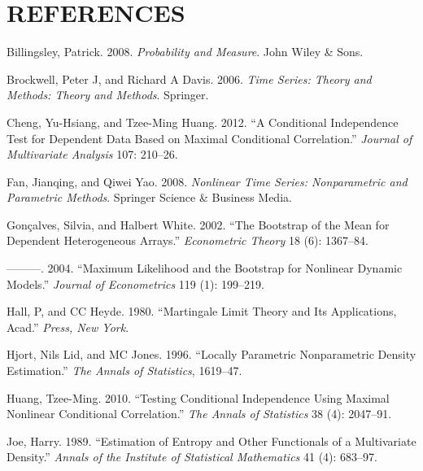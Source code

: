 \documentclass[
  12pt,
  letterpaper]{article}
\numberwithin{equation}{section}
\newlength{\cslhangindent}
\newenvironment{cslreferences}%
  {\setlength{\parindent}{0pt}%
  \everypar{\setlength{\hangindent}{\cslhangindent}}\ignorespaces}%
  {\par}
\begin{document}
\newpage

\hypertarget{references}{%
\section*{REFERENCES}\label{references}}

\hypertarget{refs}{}
\begin{cslreferences}
\leavevmode\hypertarget{ref-bill:2008}{}%
Billingsley, Patrick. 2008. \emph{Probability and Measure}. John Wiley \& Sons.

\leavevmode\hypertarget{ref-brockwell1991time}{}%
Brockwell, Peter J, and Richard A Davis. 2006. \emph{Time Series: Theory and Methods: Theory and Methods}. Springer.

\leavevmode\hypertarget{ref-cheng2012conditional}{}%
Cheng, Yu-Hsiang, and Tzee-Ming Huang. 2012. ``A Conditional Independence Test for Dependent Data Based on Maximal Conditional Correlation.'' \emph{Journal of Multivariate Analysis} 107: 210--26.

\leavevmode\hypertarget{ref-fan2008nonlinear}{}%
Fan, Jianqing, and Qiwei Yao. 2008. \emph{Nonlinear Time Series: Nonparametric and Parametric Methods}. Springer Science \& Business Media.

\leavevmode\hypertarget{ref-gonccalves2002bootstrap}{}%
Gonçalves, Silvia, and Halbert White. 2002. ``The Bootstrap of the Mean for Dependent Heterogeneous Arrays.'' \emph{Econometric Theory} 18 (6): 1367--84.

\leavevmode\hypertarget{ref-gonccalves2004maximum}{}%
---------. 2004. ``Maximum Likelihood and the Bootstrap for Nonlinear Dynamic Models.'' \emph{Journal of Econometrics} 119 (1): 199--219.

\leavevmode\hypertarget{ref-hall1980martingale}{}%
Hall, P, and CC Heyde. 1980. ``Martingale Limit Theory and Its Applications, Acad.'' \emph{Press, New York}.

\leavevmode\hypertarget{ref-hjort1996locally}{}%
Hjort, Nils Lid, and MC Jones. 1996. ``Locally Parametric Nonparametric Density Estimation.'' \emph{The Annals of Statistics}, 1619--47.

\leavevmode\hypertarget{ref-huang2010testing}{}%
Huang, Tzee-Ming. 2010. ``Testing Conditional Independence Using Maximal Nonlinear Conditional Correlation.'' \emph{The Annals of Statistics} 38 (4): 2047--91.

\leavevmode\hypertarget{ref-joe1989estimation}{}%
Joe, Harry. 1989. ``Estimation of Entropy and Other Functionals of a Multivariate Density.'' \emph{Annals of the Institute of Statistical Mathematics} 41 (4): 683--97.


\end{cslreferences}
\end{document}

